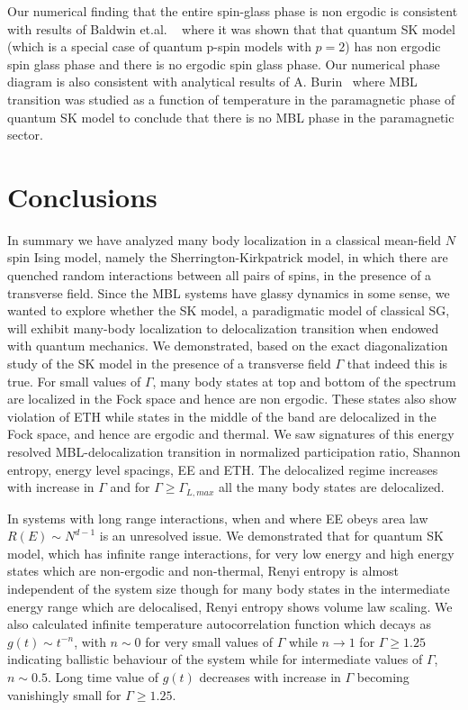 \documentclass[prl,aps,twocolumn,floats,nofootinbib]{revtex4}
\begin{document}
Our numerical finding that the entire spin-glass phase is non ergodic is consistent with results of Baldwin et.al. ~\cite{Baldwin} where it was shown that that quantum SK model (which is a special case of quantum p-spin models with $p=2$) has non ergodic spin glass phase and there is no ergodic spin glass phase. Our numerical phase diagram is also consistent with analytical results of A. Burin~\cite{Burin} where MBL transition was studied as a function of temperature in the paramagnetic phase of quantum SK model to conclude that there is no MBL phase in the paramagnetic sector. 

\section{Conclusions}
In summary we have analyzed many body localization in a classical mean-field $N$ spin Ising model, namely the Sherrington-Kirkpatrick model, in which there are quenched random interactions between all pairs of spins, in the presence of a transverse field. Since the MBL systems have glassy dynamics in some sense, we wanted to explore whether the SK model, a paradigmatic model of classical SG, will exhibit many-body localization to delocalization transition when endowed with quantum mechanics. We demonstrated, based on the exact diagonalization study of the SK model in the presence of a transverse field $\Gamma$ that indeed this is true. For small values of $\Gamma$, many body states at top and bottom of the spectrum are localized in the Fock space and hence are non ergodic. These states also show violation of ETH while states in the middle of the band are delocalized in the Fock space, and hence are ergodic and thermal. We saw signatures of this energy resolved MBL-delocalization transition in normalized participation ratio, Shannon entropy, energy level spacings, EE and ETH. The delocalized regime increases with increase in $\Gamma$ and for $\Gamma \ge \Gamma_{L,max}$ all the many body states are delocalized. 

In systems with long range interactions, when and where EE obeys area law $R(E)\sim N^{d-1}$ is an unresolved issue. We demonstrated that for quantum SK model, which has infinite range interactions, for very low energy and high energy states which are non-ergodic and non-thermal, Renyi entropy is almost independent of the system size though for many body states in the intermediate energy range which are delocalised, Renyi entropy shows volume law scaling. 
We also calculated infinite temperature autocorrelation function which decays as $g(t)\sim t^{-n}$, with $n \sim 0$ for very small values of $\Gamma$ while $n \rightarrow 1$ for $\Gamma\ge 1.25$ indicating ballistic behaviour of the system while for intermediate values of $\Gamma$, $n \sim 0.5$. Long time value of $g(t)$ decreases with increase in $\Gamma$ becoming vanishingly small for $\Gamma \ge 1.25$. 
 
\end{document}
